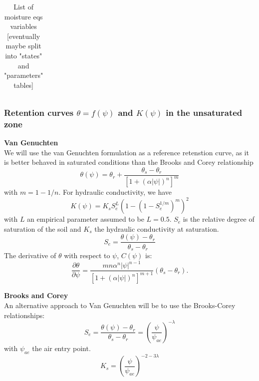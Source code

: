 \documentclass{article}
\begin{document}
\begin{table}[]
{\begin{tabular}{lllll}
\hline
\end{tabular}%
}
\caption{List of moisture eqs variables [eventually maybe split into "states" and "parameters" tables]}
\end{table}

\subsubsection{Retention curves $\theta=f(\psi)$ and $K(\psi)$ in the unsaturated zone}
\label{SoilMoisture:Retention_Curves}
    {\bf Van Genuchten} \\
We will use the van Genuchten formulation as a reference retenstion curve, as it is better behaved in saturated conditions than the Brooks and Corey relationship 
\begin{equation}
     \theta(\psi) = \theta_r + \frac{\theta_s - \theta_r}{\left[ 1+(\alpha |\psi|)^n \right]^{m}}
\end{equation}
with $m=1-1/n$.
For hydraulic conductivity, we have
\begin{equation}
     K(\psi) = K_{s} S_e^L \left (1 -  (1-S_e^{1/m})^m  \right)^2
\end{equation}
with $L$ an empirical parameter assumed to be $L=0.5$. $S_e$ is the relative degree of saturation of the soil and $K_{s}$ the hydraulic conductivity at saturation. 
\begin{equation}
     S_e = \frac{\theta(\psi) - \theta_r}{\theta_s - \theta_r}
\end{equation}
The derivative of $\theta$ with respect to $\psi$, $C(\psi)$ is:
\begin{equation}
     \frac{\partial \theta}{\partial \psi} =   \frac{m n\alpha^n |\psi|^{n-1}}{\left[ 1+(\alpha |\psi|)^n \right]^{m+1}} \left( \theta_s - \theta_r \right). 
\end{equation}


    {\bf Brooks and Corey} \\
An alternative approach to Van Genuchten will be to use the Brooks-Corey relationships:
\begin{equation}
     S_e = \frac{\theta(\psi) - \theta_r}{\theta_s - \theta_r} = \left( \frac{\psi}{\psi_{ae}}\right)^{-\lambda}
\end{equation}
with $\psi_{ae}$ the air entry point.
\begin{equation}
     K_s = \left( \frac{\psi}{\psi_{ae}}\right)^{-2-3\lambda}
\end{equation}
\end{document}
